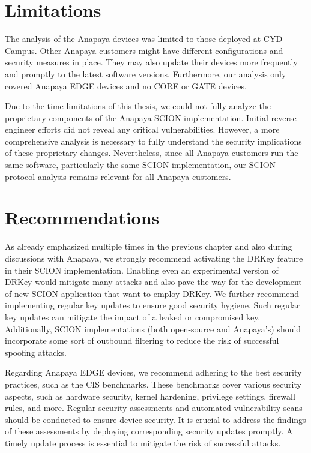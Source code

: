 \section{Limitations}
The analysis of the Anapaya devices was limited to those deployed at CYD Campus.
Other Anapaya customers might have different configurations and security measures in place.
They may also update their devices more frequently and promptly to the latest software versions.
Furthermore, our analysis only covered Anapaya EDGE devices and no CORE or GATE devices.

Due to the time limitations of this thesis, we could not fully analyze the proprietary components of the Anapaya SCION implementation.
Initial reverse engineer efforts did not reveal any critical vulnerabilities.
However, a more comprehensive analysis is necessary to fully understand the security implications of these proprietary changes.
\newpage
Nevertheless, since all Anapaya customers run the same software, particularly the same SCION implementation, our SCION protocol analysis remains relevant for all Anapaya customers.


\section{Recommendations}

As already emphasized multiple times in the previous chapter and also during discussions with Anapaya, we strongly recommend activating the DRKey feature in their SCION implementation.
Enabling even an experimental version of DRKey would mitigate many attacks and also pave the way for the development of new SCION application that want to employ DRKey.
We further recommend implementing regular key updates to ensure good security hygiene.
Such regular key updates can mitigate the impact of a leaked or compromised key.
Additionally, SCION implementations (both open-source and Anapaya's) should incorporate some sort of outbound filtering to reduce the risk of successful spoofing attacks.

Regarding Anapaya EDGE devices, we recommend adhering to the best security practices, such as the CIS benchmarks.
These benchmarks cover various security aspects, such as hardware security, kernel hardening, privilege settings, firewall rules, and more.
Regular security assessments and automated vulnerability scans should be conducted to ensure device security.
It is crucial to address the findings of these assessments by deploying corresponding security updates promptly.
A timely update process is essential to mitigate the risk of successful attacks.

